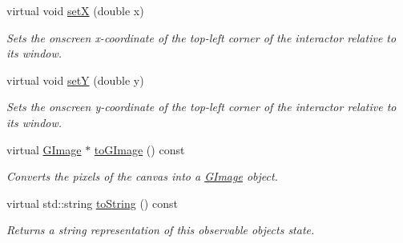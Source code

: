 \begin{DoxyCompactItemize}
virtual void \mbox{\hyperlink{classsgl_1_1GInteractor_a9c18fcc579333bf9653d13ad2b372e39}{setX}} (double x)
\begin{DoxyCompactList}\small\item\em Sets the onscreen x-\/coordinate of the top-\/left corner of the interactor relative to its window. \end{DoxyCompactList}\item 
virtual void \mbox{\hyperlink{classsgl_1_1GInteractor_a7d57e2a5c35d27feb58fd498a3cf82b9}{setY}} (double y)
\begin{DoxyCompactList}\small\item\em Sets the onscreen y-\/coordinate of the top-\/left corner of the interactor relative to its window. \end{DoxyCompactList}\item 
virtual \mbox{\hyperlink{classsgl_1_1GImage}{G\+Image}} $\ast$ \mbox{\hyperlink{classsgl_1_1GCanvas_aa2b5affed24054a09bddfe568d11200b}{to\+G\+Image}} () const
\begin{DoxyCompactList}\small\item\em Converts the pixels of the canvas into a \mbox{\hyperlink{classsgl_1_1GImage}{G\+Image}} object. \end{DoxyCompactList}\item 
virtual std\+::string \mbox{\hyperlink{classsgl_1_1GObservable_a1fe5121d6528fdea3f243321b3fa3a49}{to\+String}} () const
\begin{DoxyCompactList}\small\item\em Returns a string representation of this observable object\textquotesingle{}s state. \end{DoxyCompactList}\end{DoxyCompactItemize}

